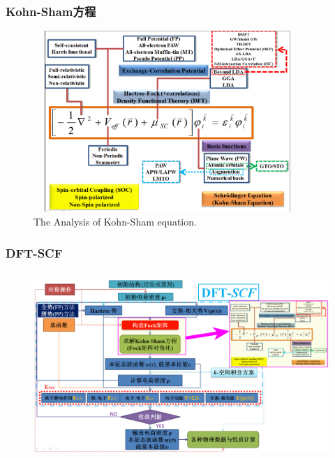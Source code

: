 \documentclass[cjk,slidestop,compress,mathserif,blue]{beamer}
\begin{document}
\frame                               %
{
	\frametitle{\textrm{Kohn-Sham}方程}
\begin{figure}[h!]
\centering
\vspace*{-0.21in}
\hspace*{-0.1in}
\includegraphics[height=2.7in,width=4.0in,viewport=2 5 1162 880,clip]{Figures/DFT.png}
\caption{\tiny \textrm{The Analysis of Kohn-Sham equation.}}%
\label{DFT}
\end{figure}
}

\frame
{
	\frametitle{\textrm{DFT-SCF}}
\begin{figure}[h!]
\centering
\vspace*{-0.25in}
\hspace*{-0.80in}
\includegraphics[height=2.80in,width=4.95in,viewport=5 3 1490 870,clip]{Figures/DFT-SCF_2.png}
\label{DFT-SCF-2}
\end{figure}
}
\end{document}
